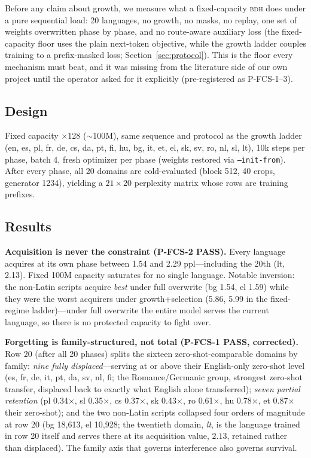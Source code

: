 \documentclass[11pt]{article}
\theoremstyle{definition}\newtheorem{definition}{Definition}
\theoremstyle{remark}\newtheorem{remark}{Remark}
\newcommand{\BDH}{\textsc{bdh}}
\begin{document}
Before any claim about growth, we measure what a fixed-capacity \BDH{} does under a
pure sequential load: 20 languages, no growth, no masks, no replay, one set of weights
overwritten phase by phase, and no route-aware auxiliary loss (the fixed-capacity floor uses the plain next-token objective, while the growth ladder couples training to a prefix-masked loss; Section~\ref{sec:protocol}). This is the floor every mechanism must beat, and it was
missing from the literature side of our own project until the operator asked for it
explicitly (pre-registered as P-FCS-1--3).

\subsection{Design}

Fixed capacity $\times$128 ($\sim$100M), same sequence and protocol as the growth ladder
(en, es, pl, fr, de, cs, da, pt, fi, hu, bg, it, et, el, sk, sv, ro, nl, sl, lt), 10k steps
per phase, batch 4, fresh optimizer per phase (weights restored via \texttt{--init-from}).
After every phase, all 20 domains are cold-evaluated (block 512, 40 crops, generator
1234), yielding a $21\times 20$ perplexity matrix whose rows are training prefixes.

\subsection{Results}

\textbf{Acquisition is never the constraint (P-FCS-2 PASS).} Every language acquires at
its own phase between 1.54 and 2.29 ppl---including the 20th (lt, 2.13). Fixed 100M capacity
saturates for no single language. Notable inversion: the non-Latin scripts acquire \emph{best}
under full overwrite (bg 1.54, el 1.59) while they were the worst acquirers under
growth+selection (5.86, 5.99 in the fixed-regime ladder)---under full overwrite the entire
model serves the current language, so there is no protected capacity to fight over.

\textbf{Forgetting is family-structured, not total (P-FCS-1 PASS, corrected).} Row 20
(after all 20 phases) splits the sixteen zero-shot-comparable domains by family:
\emph{nine fully displaced}---serving at or above their English-only zero-shot level (es,
fr, de, it, pt, da, sv, nl, fi; the Romance/Germanic group, strongest zero-shot transfer,
displaced back to exactly what English alone transferred); \emph{seven partial retention}
(pl 0.34$\times$, sl 0.35$\times$, cs 0.37$\times$, sk 0.43$\times$, ro 0.61$\times$,
hu 0.78$\times$, et 0.87$\times$ their zero-shot); and the two non-Latin scripts collapsed four orders of magnitude at row 20 (bg 18{,}613, el 10{,}928; the twentieth domain, \emph{lt}, is the language trained in row 20 itself and serves there at its acquisition value, $2.13$, retained rather than displaced). The family axis that governs
interference also governs survival.
\end{document}
